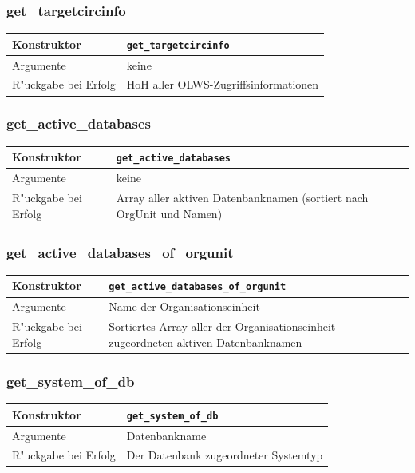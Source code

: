 \documentclass[11pt, twoside, a4paper, BCOR8mm, DIV12, bibtotoc,idxtotoc]{scrbook}
\begin{document}
\subsubsection{get\_targetcircinfo}
\begin{shadowenv}
\begin{tabular}{lp{10cm}}
  Konstruktor & \texttt{get\_targetcircinfo}\\
  \hline
  Argumente     & keine\\
  R"uckgabe bei Erfolg & HoH aller OLWS-Zugriffsinformationen\\
\end{tabular}
\end{shadowenv}

\subsubsection{get\_active\_databases}
\begin{shadowenv}
\begin{tabular}{lp{10cm}}
  Konstruktor & \texttt{get\_active\_databases}\\
  \hline
  Argumente     & keine\\
  R"uckgabe bei Erfolg & Array aller aktiven Datenbanknamen (sortiert
  nach OrgUnit und Namen)\\
\end{tabular}
\end{shadowenv}

\subsubsection{get\_active\_databases\_of\_orgunit}
\begin{shadowenv}
\begin{tabular}{lp{10cm}}
  Konstruktor & \texttt{get\_active\_databases\_of\_orgunit}\\
  \hline
  Argumente     & Name der Organisationseinheit\\
  R"uckgabe bei Erfolg & Sortiertes Array aller der Organisationseinheit
  zugeordneten aktiven Datenbanknamen\\
\end{tabular}
\end{shadowenv}

\subsubsection{get\_system\_of\_db}
\begin{shadowenv}
\begin{tabular}{lp{10cm}}
  Konstruktor & \texttt{get\_system\_of\_db}\\
  \hline
  Argumente     & Datenbankname\\
  R"uckgabe bei Erfolg & Der Datenbank zugeordneter Systemtyp\\
\end{tabular}
\end{shadowenv}
\end{document}
